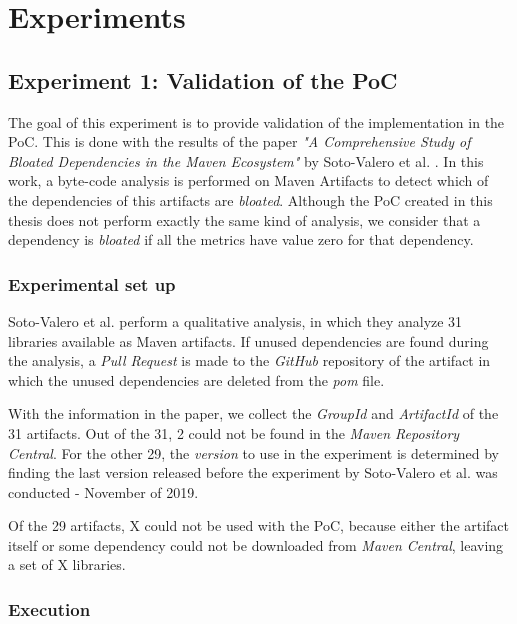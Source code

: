 \chapter{Experiments}\label{ch:Experiments}

\section{Experiment 1: Validation of the PoC}
The goal of this experiment is to provide validation of the implementation in the PoC. This is done with the results of the paper \textit{"A Comprehensive Study of Bloated Dependencies in the Maven Ecosystem"} by Soto-Valero et al. \cite{soto2020comprehensive}. In this work, a byte-code analysis is performed on Maven Artifacts to detect which of the dependencies of this artifacts are \textit{bloated}. Although the PoC created in this thesis does not perform exactly the same kind of analysis, we consider that a dependency is \textit{bloated} if all the metrics have value zero for that dependency.

\subsection{Experimental set up}
Soto-Valero et al. perform a qualitative analysis, in which they analyze 31 libraries available as Maven artifacts. If unused dependencies are found during the analysis, a \textit{Pull Request} is made to the \textit{GitHub} repository of the artifact in which the unused dependencies are deleted from the \textit{pom} file.

With the information in the paper, we collect the \textit{GroupId} and \textit{ArtifactId} of the 31 artifacts. Out of the 31, 2 could not be found in the \textit{Maven Repository Central}. For the other 29, the \textit{version} to use in the experiment is determined by finding the last version released before the experiment by Soto-Valero et al. was conducted - November of 2019.

Of the 29 artifacts, X could not be used with the PoC, because either the artifact itself or some dependency could not be downloaded from \textit{Maven Central}, leaving a set of X  libraries.

\subsection{Execution}

